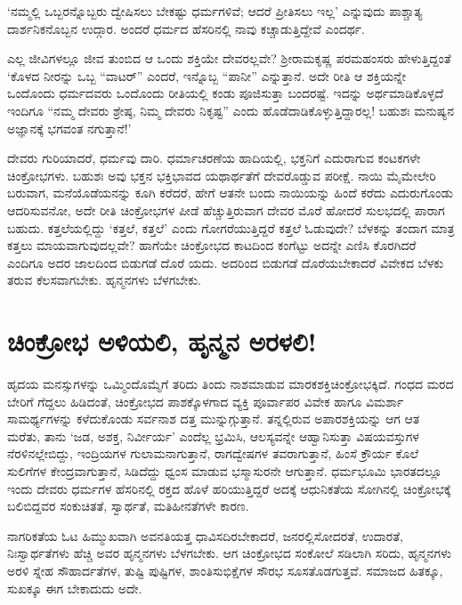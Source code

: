 
‘ನಮ್ಮಲ್ಲಿ ಒಬ್ಬರನ್ನೊಬ್ಬರು ದ್ವೇಷಿಸಲು ಬೇಕಷ್ಟು ಧರ್ಮಗಳಿವೆ; ಆದರೆ ಪ್ರೀತಿಸಲು ಇಲ್ಲ’ ಎನ್ನುವುದು ಪಾಶ್ಚಾತ್ಯ ದಾರ್ಶನಿಕನೊಬ್ಬನ ಉದ್ಗಾರ. ಅಂದರೆ ಧರ್ಮದ ಹೆಸರಿನಲ್ಲಿ ನಾವು ಕಚ್ಚಾಡುತ್ತಿದ್ದೇವೆ ಎಂದರ್ಥ.

ಎಲ್ಲ ಜೀವಿಗಳಲ್ಲೂ ಜೀವ ತುಂಬಿದ ಆ ಒಂದು ಶಕ್ತಿಯೇ ದೇವರಲ್ಲವೇ? ಶ‍್ರೀರಾಮಕೃಷ್ಣ ಪರಮಹಂಸರು ಹೇಳುತ್ತಿದ್ದಂತೆ ‘ಕೊಳದ ನೀರನ್ನು ಒಬ್ಬ “ವಾಟರ್​” ಎಂದರೆ, ಇನ್ನೊಬ್ಬ “ಪಾನೀ” ಎನ್ನುತ್ತಾನೆ. ಅದೇ ರೀತಿ ಆ ಶಕ್ತಿಯನ್ನೇ ಒಂದೊಂದು ಧರ್ಮದವರು ಒಂದೊಂದು ರೀತಿಯಲ್ಲಿ ಕಂಡು ಪೂಜಿಸುತ್ತಾ ಬಂದರಷ್ಟೆ. ಇದನ್ನು ಅರ್ಥಮಾಡಿಕೊಳ್ಳದೆ ಇಂದಿಗೂ “ನಮ್ಮ ದೇವರು ಶ್ರೇಷ್ಠ, ನಿಮ್ಮ ದೇವರು ನಿಕೃಷ್ಟ” ಎಂದು ಹೊಡೆದಾಡಿಕೊಳ್ಳುತ್ತಿದ್ದಾರಲ್ಲ! ಬಹುಶಃ ಮನುಷ್ಯನ ಅಜ್ಞಾನಕ್ಕೆ ಭಗವಂತ ನಗುತ್ತಾನೆ!’

ದೇವರು ಗುರಿಯಾದರೆ, ಧರ್ಮವು ದಾರಿ. ಧರ್ಮಾಚರಣೆಯ ಹಾದಿಯಲ್ಲಿ, ಭಕ್ತನಿಗೆ ಎದುರಾಗುವ ಕಂಟಕಗಳೇ ಚಿಂಕ್ರೋಭಗಳು. ಬಹುಶಃ ಅವು ಭಕ್ತನ ಭಕ್ತಿಭಾವದ ಯಥಾರ್ಥತೆಗೆ ದೇವರೊಡ್ಡುವ ಪರೀಕ್ಷೆ. ನಾಯಿ ಮೈಮೇಲೇರಿ ಬರುವಾಗ, ಮನೆಯೊಡೆಯನನ್ನು ಕೂಗಿ ಕರೆದರೆ, ಹೇಗೆ ಆತನೇ ಬಂದು ನಾಯಿಯನ್ನು ಹಿಂದೆ ಕರೆದು ಎದುರುಗೊಂಡು ಆದರಿಸುವನೋ, ಅದೇ ರೀತಿ ಚಿಂಕ್ರೋಭಗಳ ಪೀಡೆ ಹೆಚ್ಚುತ್ತಿರುವಾಗ ದೇವರ ಮೊರೆ ಹೋದರೆ ಸುಲಭದಲ್ಲಿ ಪಾರಾಗ ಬಹುದು. ಕತ್ತಲೆಯಲ್ಲಿದ್ದು ‘ಕತ್ತಲೆ, ಕತ್ತಲೆ’ ಎಂದು ಗೋಗರೆಯುತ್ತಿದ್ದರೆ ಕತ್ತಲೆ ಓಡುವುದೇ? ಬೆಳಕನ್ನು ತಂದಾಗ ಮಾತ್ರ ಕತ್ತಲು ಮಾಯವಾಗುವುದಲ್ಲವೇ? ಹಾಗೆಯೇ ಚಿಂಕ್ರೋಭದ ಕಾಟದಿಂದ ಕಂಗೆಟ್ಟು ಅದನ್ನೇ ಎಣಿಸಿ ಕೊರಗಿದರೆ ಎಂದಿಗೂ ಅದರ ಜಾಲದಿಂದ ಬಿಡುಗಡೆ ದೊರೆ ಯದು. ಅದರಿಂದ ಬಿಡುಗಡೆ ದೊರೆಯಬೇಕಾದರೆ ವಿವೇಕದ ಬೆಳಕು ತರುವ ಕೆಲಸವಾಗಬೇಕು. ಹೃನ್ಮನಗಳು ಬೆಳಗಬೇಕು.


\section*{ಚಿಂಕ್ರೋಭ ಅಳಿಯಲಿ, ಹೃನ್ಮನ ಅರಳಲಿ!}


ಹೃದಯ ಮನಸ್ಸುಗಳನ್ನು ಒಮ್ಮಿಂದೊಮ್ಮೆಗೆ ತರಿದು ತಿಂದು ನಾಶಮಾಡುವ ಮಾರಕಶಕ್ತಿ\break ಚಿಂಕ್ರೋಭಕ್ಕಿದೆ. ಗಂಧದ ಮರದ ಬೇರಿಗೆ ಗೆದ್ದಲು ಹಿಡಿದಂತೆ, ಚಿಂಕ್ರೋಭದ ಪಾಶಕ್ಕೊಳಗಾದ ವ್ಯಕ್ತಿ ಪೂರ್ವಾಪರ ವಿವೇಕ ಹಾಗೂ ವಿಮರ್ಶಾ ಸಾಮರ್ಥ್ಯಗಳನ್ನು ಕಳೆದುಕೊಂಡು ಸರ್ವನಾಶ ದತ್ತ ಮುನ್ನುಗ್ಗುತ್ತಾನೆ. ತನ್ನಲ್ಲಿರುವ ಅಪಾರಶಕ್ತಿಯನ್ನು ಆಗ ಆತ ಮರೆತು, ತಾನು ‘ಜಡ, ಅಶಕ್ತ, ನಿರ್ವೀರ್ಯ’ ಎಂದೆಲ್ಲ ಭ್ರಮಿಸಿ, ಆಲಸ್ಯವನ್ನೇ ಆಹ್ವಾನಿಸುತ್ತಾ ವಿಷಯವಸ್ತುಗಳ \hbox\bgroup ನೆರಳಿನಲ್ಲೇ\egroup\break ಬಿದ್ದು, ಇಂದ್ರಿಯಗಳ ಗುಲಾಮನಾಗುತ್ತಾನೆ, ರಾಗದ್ವೇಷಗಳ ತವರಾಗುತ್ತಾನೆ, ಹಿಂಸೆ ಕ್ರೌರ್ಯ ಕೊಲೆ ಸುಲಿಗೆಗಳ ಕೇಂದ್ರವಾಗುತ್ತಾನೆ, ಸಿಡಿದೆದ್ದು ಧ್ವಂಸ ಮಾಡುವ ಭಸ್ಮಾಸುರನೇ ಆಗುತ್ತಾನೆ. ಧರ್ಮಭೂಮಿ ಭಾರತದಲ್ಲೂ ಇಂದು ದೇವರು ಧರ್ಮಗಳ ಹೆಸರಿನಲ್ಲಿ ರಕ್ತದ ಹೊಳೆ ಹರಿಯು\-ತ್ತಿದ್ದರೆ ಅದಕ್ಕೆ ಆಧುನಿಕತೆಯ ಸೋಗಿನಲ್ಲಿ ಚಿಂಕ್ರೋಭಕ್ಕೆ ಬಲಿಬಿದ್ದವರ ಸಂಕುಚಿತತೆ, ಸ್ವಾರ್ಥತೆ, ಮತಿಹೀನತೆಗಳೇ ಕಾರಣ.

ನಾಗರಿಕತೆಯ ಓಟ ಹಿಮ್ಮುಖವಾಗಿ ಅವನತಿಯತ್ತ ಧಾವಿಸದಿರಬೇಕಾದರೆ, ಜನರಲ್ಲಿ\break ಸೋದರತೆ, ಉದಾರತೆ, ನಿಃಸ್ವಾರ್ಥತೆಗಳು ಹೆಚ್ಚಿ ಅವರ ಹೃನ್ಮನಗಳು ಬೆಳಗಬೇಕು. ಆಗ ಚಿಂಕ್ರೋಭದ ಸಂಕೋಲೆ ಸಡಿಲಾಗಿ ಸರಿದು, ಹೃನ್ಮನಗಳು ಅರಳಿ ಸ್ನೇಹ ಸೌಹಾರ್ದತೆಗಳ, ತುಷ್ಟಿ ಪುಷ್ಟಿಗಳ, ಶಾಂತಿಸುಭಿಕ್ಷೆಗಳ ಸೌರಭ ಸೂಸತೊಡಗುತ್ತವೆ. ಸಮಾಜದ ಹಿತಕ್ಕೂ, ಸುಖಕ್ಕೂ ಈಗ ಬೇಕಾದುದು ಅದೇ.

\chapterend


